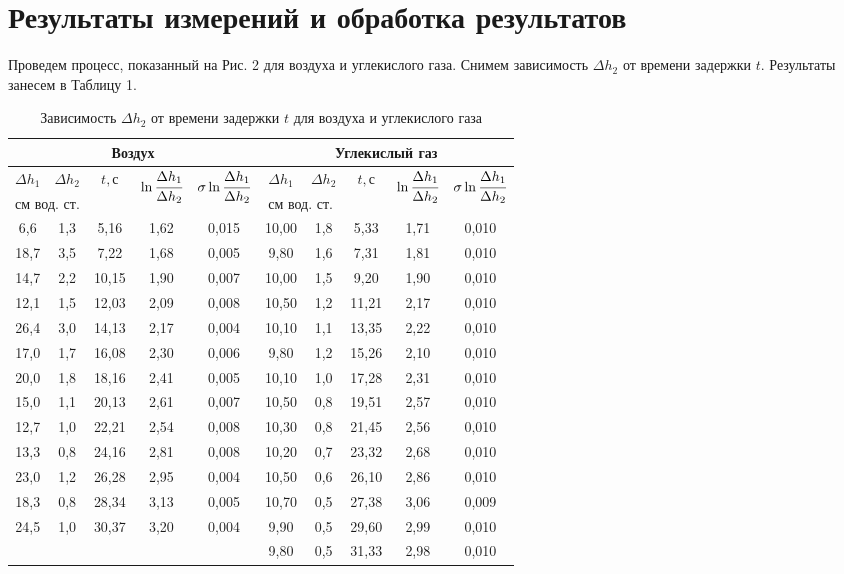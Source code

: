 \documentclass[a4paper,12pt]{article}
\theoremstyle{plain} %
\theoremstyle{definition} %
\theoremstyle{remark} %
\begin{document}
\section{Результаты измерений и обработка результатов}
Проведем процесс, показанный на Рис. 2 для воздуха и углекислого газа. Снимем зависимость $\Delta h_2$ от времени задержки $t$. Результаты занесем в Таблицу 1.
\renewcommand{\arraystretch}{1.15}
\begin{table}[H]
	\begin{center}
	\begin{tabular}{|c|c|c|c|c||c|c|c|c|c|}
		\hline
		\multicolumn{5}{|c||}{Воздух} & \multicolumn{5}{c|}{Углекислый газ}  \\ \hline
		\rule{0ex}{3ex}
		$\Delta h_1$  & $\Delta h_2$   & \multirow{2}{*}{$t, \text{с}$} & \multirow{2}{*}{$\ln\cfrac{
				\Delta h_1}{\Delta h_2}$} & \multirow{2}{*}{$\sigma\ln\cfrac{
				\Delta h_1}{\Delta h_2}$ } &$\Delta h_1$  & $\Delta h_2$   & \multirow{2}{*}{$t, \text{с}$} & \multirow{2}{*}{$\ln\cfrac{
				\Delta h_1}{\Delta h_2}$} & \multirow{2}{*}{$\sigma\ln\cfrac{
				\Delta h_1}{\Delta h_2}$ }  \\[1ex] \cline{1-2} \cline{6-7}
		\multicolumn{2}{|c|}{$\text{см вод. ст.}$} & & & &\multicolumn{2}{|c|}{$\text{см вод. ст.}$} & & & \\ \hline
6,6  & 1,3 & 5,16  & 1,62 & 0,015 & 10,00 & 1,8 & 5,33  & 1,71 & 0,010 \\ \hline
18,7 & 3,5 & 7,22  & 1,68 & 0,005 & 9,80  & 1,6 & 7,31  & 1,81 & 0,010 \\ \hline
14,7 & 2,2 & 10,15 & 1,90 & 0,007 & 10,00 & 1,5 & 9,20  & 1,90 & 0,010 \\ \hline
12,1 & 1,5 & 12,03 & 2,09 & 0,008 & 10,50 & 1,2 & 11,21 & 2,17 & 0,010 \\ \hline
26,4 & 3,0 & 14,13 & 2,17 & 0,004 & 10,10 & 1,1 & 13,35 & 2,22 & 0,010 \\ \hline
17,0 & 1,7 & 16,08 & 2,30 & 0,006 & 9,80  & 1,2 & 15,26 & 2,10 & 0,010 \\ \hline
20,0 & 1,8 & 18,16 & 2,41 & 0,005 & 10,10 & 1,0 & 17,28 & 2,31 & 0,010 \\ \hline
15,0 & 1,1 & 20,13 & 2,61 & 0,007 & 10,50 & 0,8 & 19,51 & 2,57 & 0,010 \\ \hline
12,7 & 1,0 & 22,21 & 2,54 & 0,008 & 10,30 & 0,8 & 21,45 & 2,56 & 0,010 \\ \hline
13,3 & 0,8 & 24,16 & 2,81 & 0,008 & 10,20 & 0,7 & 23,32 & 2,68 & 0,010 \\ \hline
23,0 & 1,2 & 26,28 & 2,95 & 0,004 & 10,50 & 0,6 & 26,10 & 2,86 & 0,010 \\ \hline
18,3 & 0,8 & 28,34 & 3,13 & 0,005 & 10,70 & 0,5 & 27,38 & 3,06 & 0,009 \\ \hline
24,5 & 1,0 & 30,37 & 3,20 & 0,004 & 9,90  & 0,5 & 29,60 & 2,99 & 0,010 \\ \hline
\multicolumn{5}{c|}{}      & 9,80  & 0,5 & 31,33 & 2,98 & 0,010 \\ \cline{6-10}
	\end{tabular}
\captionsetup{justification=centering}
\caption{Зависимость $\Delta h_2$ от времени задержки $t$ для воздуха и углекислого газа}
\end{center}
\end{table}
\end{document}
